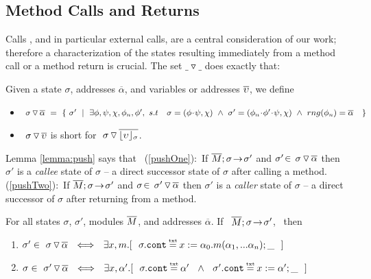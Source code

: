  \subsection{ Method Calls and Returns}

 
Calls , and in particular external calls, are a central consideration of our work; therefore a characterization of the states resulting immediately from a method call or a method return is crucial. 
 The set ${\_} \triangledown {\_}$ does exactly that:
 
\begin{definition}
\label{def:push:frame}
Given a state $\sigma$, addresses $\overline \alpha$, and variables or addresses $\overline {\upsilon}$, we define
\begin{itemize}
\item
$ \PushS  {\alpha} {\sigma} \ =\ \{ \ \sigma' \ \mid\ \exists \phi,\psi,\chi,\phi_n,\phi',\ s.t\ \  \ \sigma=(\phi\!\cdot\!\psi, \chi)\  \wedge\  \sigma'=(\phi_n\!\cdot\!\phi'\!\cdot\!\psi, \chi) \ \wedge\   rng(\phi_n)=\overline \alpha \ \   \ \}$
\item
{$  \ {\sigma} \, {\triangledown}\, \overline{\upsilon} $ is short for  $  \ {\sigma} \, {\triangledown}\, \overline{\lfloor \upsilon \rfloor_{\sigma}}  $.}
\end{itemize}
 \end{definition}

 Lemma \ref{lemma:push} says that %
\  (\ref{pushOne}):\  If $\overline{M};\sigma\! \rightarrow\! {\sigma'} $ and $\sigma'\!\in\! \ {\sigma} \, {\triangledown}\, \overline{\alpha} $ then $\sigma'$ is a  \emph{callee} state of $\sigma$ --  {a direct successor state of    $\sigma$  after calling a method}. %
 (\ref{pushTwo}):\  If $\overline{M};\sigma\! \rightarrow\! {\sigma'} $ and $\sigma\! \in\!  \ {\sigma'} \, {\triangledown}\, \overline{\alpha} $  then $\sigma'$ is a  \emph{caller} state  of $\sigma$ -- {a direct successor  of $\sigma$}  after returning from a method.
  
\begin{lemma}%
\label{lemma:push}
For all states $\sigma$, $\sigma'$, modules $\overline{M}$, and addresses $\overline \alpha$. If \ $\overline{M};\sigma\! \rightarrow\! {\sigma'} $, \ then 
\begin{enumerate}
\item
\label{pushOne}
$\sigma'\in   \PushS  {\alpha} {\sigma}  \ \ \Longleftrightarrow \ \ 
\exists x, m.[\ \ \sigma.\prg{cont} \txteq x:=\alpha_0.m(\alpha_1,...\alpha_n); \_\ \ ] $
\item
\label{pushTwo}
$\sigma\in   \PushS  {\alpha} {\sigma'}  \ \ \Longleftrightarrow \ \ \exists x, \alpha'.[\ \  \sigma.\prg{cont}\txteq\alpha' \ \ \wedge \ \ \sigma'.\prg{cont}\txteq x:=\alpha';\_ \ \ ] $
\end{enumerate}

\end{lemma}

